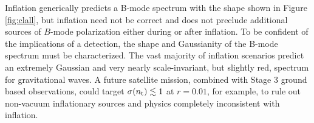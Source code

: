 Inflation generically predicts a B-mode spectrum with the shape shown in Figure \ref{fig:clall}, but inflation need not be correct \cite{} and does not preclude additional sources of $B$-mode polarization either during or after inflation. To be confident of the implications of a detection, the shape and Gaussianity of the B-mode spectrum must be characterized. 
The vast majority of inflation scenarios predict an extremely Gaussian and very nearly scale-invariant, but slightly red, spectrum for gravitational waves. A future satellite mission, combined with Stage 3 ground based observations, could target $\sigma(n_{\rm t})\lesssim1$ at $r=0.01$, for example, to rule out non-vacuum inflationary sources  \cite{Namba:2015gja,Peloso:2016gqs} and physics completely inconsistent with inflation. 



